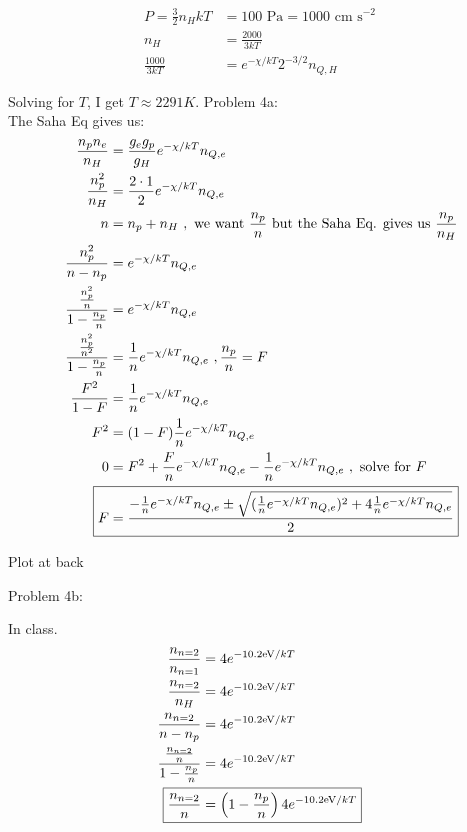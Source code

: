 \documentclass[10pt,letter,preprint]{aastex}
\newcommand{\rp}{\right)}
\newcommand{\lp}{\left(}
\begin{document}
\begin{align}
P = \frac{3}{2}n_HkT &= 100 \textrm{ Pa} = 1000 \textrm{ cm s}^{-2}\\
n_H &= \frac{2000}{3kT}\\
\frac{1000}{3kT} &= e^{-\chi/kT}2^{-3/2}n_{Q,H}
\end{align}

Solving for $T$, I get $\boxed{T \approx 2291 K}$.
\newpage
Problem 4a:\\
%
The Saha Eq gives us:
%
\begin{align}
\frac{n_pn_e}{n_H} &= \frac{g_eg_p}{g_H}e^{-\chi/kT}n_{Q,e}\\
\frac{n_p^2}{n_H} &= \frac{2 \cdot 1}{2} e^{-\chi/kT}n_{Q,e}\\
n &= n_p + n_H~,\textrm{ we want } \frac{n_p}{n}\textrm{ but the Saha Eq. gives us } \frac{n_p}{n_H}\\
\frac{n_p^2}{n - n_p} &=  e^{-\chi/kT}n_{Q,e}\\
\frac{\frac{n_p^2}{n}}{1- \frac{n_p}{n}} &=  e^{-\chi/kT}n_{Q,e}\\\
\frac{\frac{n_p^2}{n^2}}{1- \frac{n_p}{n}} &=  \frac{1}{n} e^{-\chi/kT}n_{Q,e}~,\frac{n_p}{n} = F\\
\frac{F^2}{1-F}&=  \frac{1}{n} e^{-\chi/kT}n_{Q,e}\\
F^2 &= (1-F)\frac{1}{n} e^{-\chi/kT}n_{Q,e}\\
0&= F^2 + \frac{F}{n}e^{-\chi/kT}n_{Q,e}-\frac{1}{n} e^{-\chi/kT}n_{Q,e}~,\textrm{ solve for $F$}\\
\Aboxed{F &= \frac{-\frac{1}{n} e^{-\chi/kT}n_{Q,e} \pm \sqrt{(\frac{1}{n} e^{-\chi/kT}n_{Q,e})^2 + 4 \frac{1}{n} e^{-\chi/kT}n_{Q,e}}}{2}}
\end{align}

Plot at back

Problem 4b:

In class.
\begin{align}
\frac{n_{n=2}}{n_{n=1}} &= 4 e^{-10.2\textrm{eV}/kT}\\
\frac{n_{n=2}}{n_H} &= 4 e^{-10.2\textrm{eV}/kT}\\
\frac{n_{n=2}}{n- n_p} &= 4 e^{-10.2\textrm{eV}/kT}\\
\frac{\frac{n_{n=2}}{n}}{1 - \frac{n_p}{n}} &=  4 e^{-10.2\textrm{eV}/kT}\\
\Aboxed{\frac{n_{n=2}}{n} &= \lp {1 - \frac{n_p}{n}} \rp 4 e^{-10.2\textrm{eV}/kT}}
\end{align}
\end{document}
